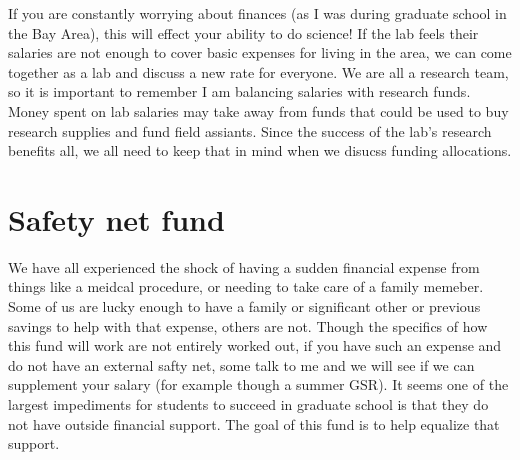 \documentclass[12pt]{article}
\begin{document}
If you are constantly worrying about finances (as I was during
graduate school in the Bay Area), this will effect your ability to do
science! If the lab feels their salaries are not enough to cover basic
expenses for living in the area, we can come together as a lab and
discuss a new rate for everyone. We are all a research team, so it is
important to remember I am balancing salaries with research
funds. Money spent on lab salaries may take away from funds that could
be used to buy research supplies and fund field assiants. Since the
success of the lab's research benefits all, we all need to keep that
in mind when we disucss funding allocations.

\section{Safety net fund}
We have all experienced the shock of having a sudden financial expense
from things like a meidcal procedure, or needing to take care of a
family memeber. Some of us are lucky enough to have a family or
significant other or previous savings to help with that expense,
others are not. Though the specifics of how this fund will work are
not entirely worked out, if you have such an expense and do not have
an external safty net, some talk to me and we will see if we can
supplement your salary (for example though a summer GSR). It seems one
of the largest impediments for students to succeed in graduate school
is that they do not have outside financial support. The goal of this
fund is to help equalize that support.
\end{document}
